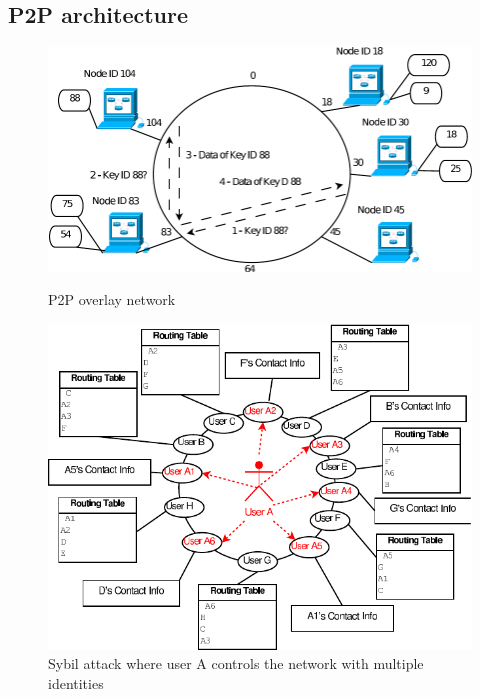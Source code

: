 \documentclass[a4paper,10pt]{article}
\begin{document}
\subsection{P2P architecture}
\begin{figure}[t]

  \begin{minipage}{.5\textwidth}
    \centering
    \includegraphics[width=\textwidth]{p2p}
    \caption{P2P overlay network \cite{touceda}}
    \label{fig:p2p}
  \end{minipage}
\hfill
  \begin{minipage}{.5\textwidth}
    \centering
    \includegraphics[width=\textwidth]{sybil}
    \caption{Sybil attack where user A controls the network with multiple
    identities \cite{touceda}}
    \label{fig:sybil}
  \end{minipage}

\end{figure}
\end{document}
